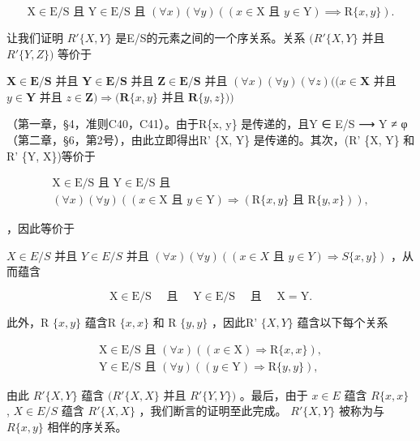 \[
\mathrm{X} \in \mathrm{E} / \mathrm{S} \text {   且   } \mathrm{Y} \in \mathrm{E} / \mathrm{S} \text {   且   } (\forall x) (\forall y) ((x \in \mathrm{X} \text {   且   } y \in \mathrm{Y}) \implies \mathrm{R} \{x, y \}).
\]

让我们证明 \(R'\{X, Y\}\) 是E/S的元素之间的一个序关系。关系 \((R'\{X, Y\}\) 并且 \(R'\{Y, Z\})\) 等价于

\(\mathbf{X} \in \mathbf{E} / \mathbf{S}\) 并且 \(\mathbf{Y} \in \mathbf{E} / \mathbf{S}\) 并且 \(\mathbf{Z} \in \mathbf{E} / \mathbf{S}\) 并且 \((\forall x)(\forall y)(\forall z)((x \in \mathbf{X}\) 并且 \(y \in \mathbf{Y}\) 并且 \(z \in \mathbf{Z}) \Longrightarrow (\mathbf{R}\{x, y\}\) 并且 \(\mathbf{R}\{y, z\}))\)

（第一章，§4，准则C40，C41）。由于R\{x, y\} 是传递的，且Y ∈ E/S ⟶ Y ≠ φ（第二章，§6，第2号），由此立即得出R' \{X, Y\} 是传递的。其次，(R' \{X, Y\} 和R' \{Y, X\})等价于

\[
\begin{array}{l} \mathrm{X} \in \mathrm{E} / \mathrm{S} \text { 且 } \mathrm{Y} \in \mathrm{E} / \mathrm{S} \text { 且 } \\ (\forall x) (\forall y) ((x \in \mathrm{X} \text { 且 } y \in \mathrm{Y}) \Longrightarrow (\mathrm{R} \{x, y \} \text { 且 } \mathrm{R} \{y, x \})), \end{array}
\]

，因此等价于

\(X \in E/S\) 并且 \(Y \in E/S\) 并且 \((\forall x)(\forall y)((x \in X \text{ 且 } y \in Y) \Longrightarrow S\{x, y\})\) ，从而蕴含

\[
\mathrm{X} \in \mathrm{E} / \mathrm{S} \quad \text { 且 } \quad \mathrm{Y} \in \mathrm{E} / \mathrm{S} \quad \text { 且 } \quad \mathrm{X} = \mathrm{Y}.
\]

此外，R \(\{x, y\}\) 蕴含R \(\{x, x\}\) 和 R \(\{y, y\}\) ，因此R' \(\{X, Y\}\) 蕴含以下每个关系

\[
\begin{array}{l} \mathrm{X} \in \mathrm{E} / \mathrm{S} \text { 且 } (\forall x) ((x \in \mathrm{X}) \Longrightarrow \mathrm{R} \{x, x \}), \\ \mathrm{Y} \in \mathrm{E} / \mathrm{S} \text { 且 } (\forall y) ((y \in \mathrm{Y}) \Longrightarrow \mathrm{R} \{y, y \}), \end{array}
\]

由此 \(R'\{X,Y\}\) 蕴含 \((R'\{X,X\}\) 并且 \(R'\{Y,Y\})\) 。最后，由于 \(x \in E\) 蕴含 \(R\{x,x\}\) , \(X \in E/S\) 蕴含 \(R'\{X,X\}\) ，我们断言的证明至此完成。 \(R'\{X,Y\}\) 被称为与 \(R\{x,y\}\) 相伴的序关系。

